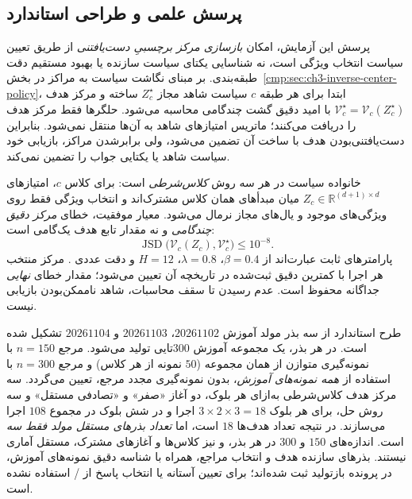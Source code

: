 \subsection{پرسش علمی و طراحی استاندارد}
\label{subsec:ch4-inverse-protocol}
پرسش این آزمایش، امکان \emph{بازسازی مرکز برچسبیِ دست‌یافتنی} از طریق تعیین سیاست انتخاب ویژگی است، نه شناسایی یکتای سیاست سازنده یا بهبود مستقیم دقت طبقه‌بندی. بر مبنای نگاشت سیاست به مراکز در بخش~\ref{cmp:sec:ch3-inverse-center-policy}، ابتدا برای هر طبقه $c$ سیاست شاهد مجاز $Z_c^\star$ ساخته و مرکز هدف $\mathcal V_c^\star=\mathcal V_c(Z_c^\star)$ با امید دقیق گشت چندگامی محاسبه می‌شود. حلگرها فقط مرکز هدف را دریافت می‌کنند؛ ماتریس امتیازهای شاهد به آن‌ها منتقل نمی‌شود. بنابراین دست‌یافتنی‌بودن هدف با ساخت آن تضمین می‌شود، ولی برابرشدن مراکز، بازیابی خود سیاست شاهد یا یکتایی جواب را تضمین نمی‌کند.

خانواده سیاست در هر سه روش \emph{کلاس‌شرطی} است: برای کلاس $c$، امتیازهای $Z_c\in\mathbb R^{(d+1)\times d}$ میان مبدأهای همان کلاس مشترک‌اند و انتخاب ویژگی فقط روی ویژگی‌های موجود و یال‌های مجاز نرمال می‌شود. معیار موفقیت، خطای \emph{مرکز دقیق چندگامی} و نه مقدار تابع هدف یک‌گامی است:
\begin{equation}\label{eq:ch4-inverse-success}
\operatorname{JSD}\!\bigl(\mathcal V_c(Z_c),\mathcal V_c^\star\bigr)\le10^{-8}.
\end{equation}
پارامترهای ثابت عبارت‌اند از $\beta=0.4$، $\lambda=0.8$، $H=12$ و دقت عددی . مرکز منتخب هر اجرا با کمترین  دقیق ثبت‌شده در تاریخچه آن تعیین می‌شود؛ مقدار خطای \emph{نهایی} جداگانه محفوظ است. عدم رسیدن تا سقف محاسبات، شاهد ناممکن‌بودن بازیابی نیست.

طرح استاندارد از سه بذر مولد آموزش $20261102$، $20261103$ و $20261104$ تشکیل شده است. در هر بذر، یک مجموعه آموزش $300$تایی تولید می‌شود. مرجع $n=150$ با نمونه‌گیری متوازن از همان مجموعه ($50$ نمونه از هر کلاس) و مرجع $n=300$ با استفاده از \emph{همه نمونه‌های آموزش}، بدون نمونه‌گیری مجدد مرجع، تعیین می‌گردد. سه مرکز هدف کلاس‌شرطی به‌ازای هر بلوک، دو آغاز «صفر» و «تصادفی مستقل» و سه روش حل، برای هر بلوک $3\times2\times3=18$ اجرا و در شش بلوک در مجموع $108$ اجرا می‌سازند. در نتیجه تعداد هدف‌ها $18$ است، اما \emph{تعداد بذرهای مستقل مولد فقط سه} است. اندازه‌های $150$ و $300$ در هر بذر، و نیز کلاس‌ها و آغازهای مشترک، مستقل آماری نیستند. بذرهای سازنده هدف و انتخاب مراجع، همراه با شناسه دقیق نمونه‌های آموزش، در پرونده بازتولید ثبت شده‌اند؛ برای تعیین آستانه یا انتخاب پاسخ از / استفاده نشده است.



